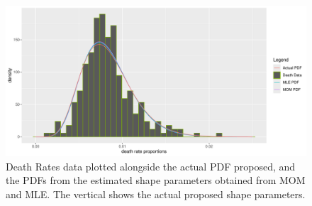 \documentclass{article}\usepackage[]{graphicx}\usepackage[]{xcolor}
\makeatletter
\def\maxwidth{ %
  \ifdim\Gin@nat@width>\linewidth
    \linewidth
  \else
    \Gin@nat@width
  \fi
}
\newenvironment{knitrout}{}{} %
\makeatother
\begin{document}
\begin{figure}[H]
 \begin{center}
\begin{knitrout}
\color{fgcolor}
\includegraphics[width=\maxwidth]{figure/unnamed-chunk-6-1} 
\end{knitrout}
 \caption{Death Rates data plotted alongside the actual PDF proposed, and the PDFs from the estimated shape parameters obtained from MOM and MLE. The vertical shows the actual proposed shape parameters.}
 \label{plot6} %
 \end{center}
 \end{figure}
\end{document}
